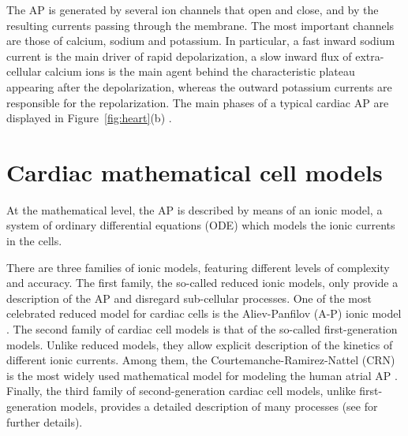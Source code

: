 \documentclass[11pt,a4paper]{article}
\begin{document}
The AP is generated by several ion channels that open and close, and by
the resulting currents passing through the membrane. The most important
channels are those of calcium, sodium and potassium. In particular, a fast
inward sodium current is the main driver of rapid depolarization, a slow
inward flux of extra-cellular calcium ions is the main agent behind the characteristic plateau appearing after the depolarization, whereas the outward
potassium currents are responsible for the repolarization. The main phases of a typical cardiac AP are displayed in Figure~\ref{fig:heart}(b) \cite{quarteroni2019,franzone2014mathematical}.


\section{Cardiac mathematical cell models}\label{sec:math}
At the mathematical level, the AP is described by means of an ionic model, a system of ordinary differential equations (ODE) which models the ionic currents in the cells.

There are three families of ionic models, featuring different levels of complexity and accuracy. The first family, the so-called reduced ionic models, only provide a description of the AP and disregard sub-cellular processes. One of the most celebrated reduced model for cardiac cells is the Aliev-Panfilov (A-P) ionic model \cite{aliev1996simple}. The second family of cardiac cell models is that of the so-called first-generation models. Unlike reduced models, they allow explicit description of the kinetics of different ionic currents. Among them, the Courtemanche-Ramirez-Nattel (CRN) is the most widely used mathematical model for modeling the human atrial AP \cite{courtemanche1998ionic}. Finally, the third family of second-generation cardiac cell models, unlike first-generation models, provides a detailed description of many processes (see \cite{quarteroni2019,franzone2014mathematical} for further details). 
 
\end{document}
